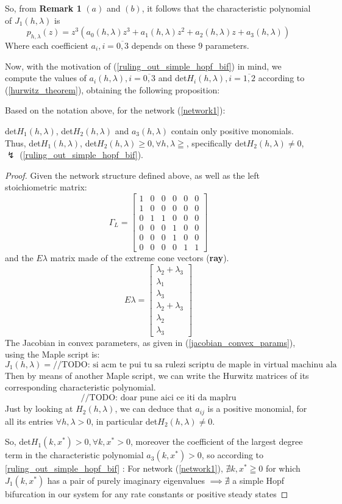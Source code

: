 So, from \textbf{Remark 1} $(a)$ and $(b)$, it follows that the characteristic polynomial of $J_1(h, \lambda)$ is
\[
	p_{h,\lambda}(z) = z^3 (a_0(h,\lambda) z^3 + a_1(h, \lambda)z^2 + a_2 (h,\lambda)z + a_3(h,\lambda) )
\]
Where each coefficient $a_i, i = \overline{0,3}$ depends on these $9$ parameters.

Now, with the motivation of (\ref{ruling_out_simple_hopf_bif}) in mind, we compute the values of $a_i(h,\lambda), i = \overline{0,3}$ and det$H_i(h,\lambda), i = \overline{1,2}$ according to (\ref{hurwitz_theorem}), obtaining the following proposition:
\begin{proposition}
	Based on the notation above, for the network (\ref{network1}):

	det$H_1(h,\lambda)$, det$H_2(h,\lambda)$ and $a_3(h,\lambda)$ contain only positive monomials. Thus, det$H_1(h,\lambda)$, det$H_2(h,\lambda) \geq 0, \forall h, \lambda \geqq$, specifically det$H_2(h,\lambda) \neq 0$, $\lightning$ (\ref{ruling_out_simple_hopf_bif}).
\end{proposition}
\begin{proof}
	Given the network structure defined above, as well as the left stoichiometric matrix:
	\[
		\Gamma_L =
		\begin{bmatrix}
			1&0&0&0&0&0\\
			1&0&0&0&0&0\\
			0&1&1&0&0&0\\
			0&0&0&1&0&0\\
			0&0&0&1&0&0\\
			0&0&0&0&1&1
		\end{bmatrix}
	\]
	and the $E\lambda$ matrix made of the extreme cone vectors (\textbf{ray}).
	\[
		E\lambda =
		\begin{bmatrix}
			\lambda_2 + \lambda_3 \\
			\lambda_1 \\
			\lambda_3 \\
			\lambda_2 + \lambda_3 \\
			\lambda_2 \\
			\lambda_3
		\end{bmatrix}
	\]
	The Jacobian in convex parameters, as given in (\ref{jacobian_convex_params}), using the Maple script is:
	\[
		J_1(h,\lambda)=
		\text{//TODO: si acm te pui tu sa rulezi scriptu de maple in virtual machinu ala}
	\]
	Then by means of another Maple script, we can write the Hurwitz matrices of its corresponding characteristic polynomial.
	\[
		\text{//TODO: doar pune aici ce iti da maplru}
	\]
	Just by looking at $H_2(h,\lambda)$, we can deduce that $a_{ij}$ is a positive monomial, for all  its entries $\forall h , \lambda > 0$, in particular det$H_2(h, \lambda) \neq 0$.

	So, det$H_1(k,x^*) > 0, \forall k, x^* > 0$, moreover the coefficient of the largest degree term in the characteristic polynomial $a_3(k, x^*) > 0$, so according to \ref{ruling_out_simple_hopf_bif} : For network (\ref{network1}), $\nexists k, x^* \geqq 0$ for which $J_1(k,x^*)$ has a pair of purely imaginary eigenvalues $\implies \nexists$ a simple Hopf bifurcation in our system for any rate constants or positive steady states
\end{proof}

